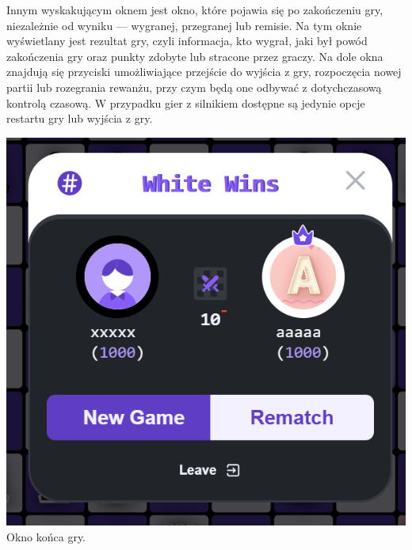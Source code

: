 \documentclass[12pt,a4paper]{article}
\begin{document}
\begin{minipage}[t]{0.55\textwidth} 
    \vspace{0pt} 
    \raggedright 
    Innym wyskakującym oknem jest okno, które pojawia się po zakończeniu gry, niezależnie od wyniku — wygranej, przegranej lub remisie. Na tym oknie wyświetlany jest rezultat gry, czyli informacja, kto wygrał, jaki był powód zakończenia gry oraz punkty zdobyte lub stracone przez graczy. Na dole okna znajdują się przyciski umożliwiające przejście do wyjścia z gry, rozpoczęcia nowej partii lub rozegrania rewanżu, przy czym będą one odbywać z dotychczasową kontrolą czasową. W przypadku gier z silnikiem dostępne są jedynie opcje restartu gry lub wyjścia z gry.
\end{minipage} 
\hfill 
\begin{minipage}[t]{0.35\textwidth} 
    \vspace{0pt} 
    \centering 
    \includegraphics[width=\linewidth]{images/ins_min_win.png} 
    Okno końca gry.
\end{minipage}

\newpage
\end{document}
